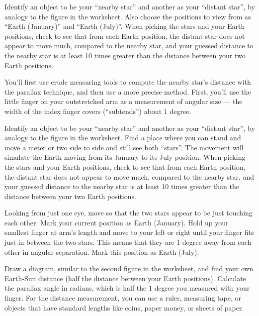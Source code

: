 \begin{steps}
	\item Identify an object to be your ``nearby star'' and another as your ``distant star'', by analogy to the figure in the worksheet. Also choose the positions to view from as ``Earth (January)'' and ``Earth (July)''. When picking the stars and your Earth positions, check to see that from each Earth position, the distant star does not appear to move much, compared to the nearby star, and your guessed distance to the nearby star is at least 10 times greater than the distance between your two Earth positions.
\end{steps}
	
You'll first use crude measuring tools to compute the nearby star's distance with the parallax technique, and then use a more precise method. First, you'll use the little finger on your outstretched arm as a measurement of angular size --- the width of the index finger covers (``subtends'') about 1 degree.

\begin{steps}
	\item Identify an object to be your ``nearby star'' and another as your ``distant star'', by analogy to the figure in the worksheet. Find a place where you can stand and move a meter or two side to side and still see both ``stars''. The movement will simulate the Earth moving from its January to its July position. When picking the stars and your Earth positions, check to see that from each Earth position, the distant star does not appear to move much, compared to the nearby star, and your guessed distance to the nearby star is at least 10 times greater than the distance between your two Earth positions.
	
	\item Looking from just one eye, move so that the two stars appear to be just touching each other. Mark your current position as Earth (January). Hold up your smallest finger at arm's length and move to your left or right until your finger fits just in between the two stars. This means that they are 1 degree away from each other in angular separation. Mark this position as Earth (July).
	
	\item Draw a diagram, similar to the second figure in the worksheet, and find your own Earth-Sun distance (half the distance between your Earth positions). Calculate the parallax angle in radians, which is half the 1 degree you measured with your finger. For the distance measurement, you can use a ruler, measuring tape, or objects that have standard lengths like coins, paper money, or sheets of paper.
\end{steps}
	
